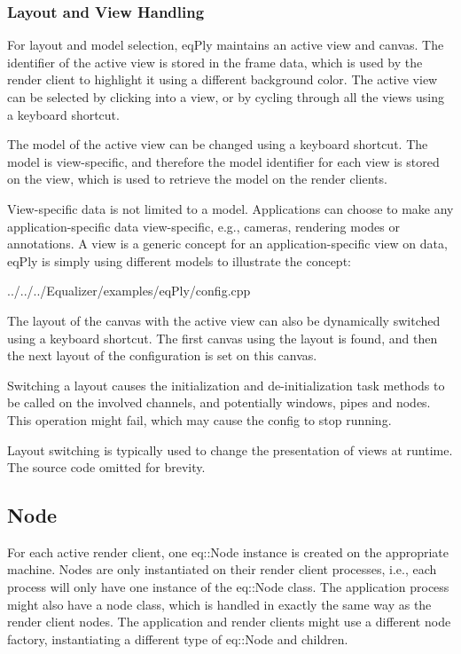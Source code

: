 \documentclass[10pt,a4]{scrartcl}
\begin{document}
\subsubsection{Layout and View Handling}

For layout and model selection, \textsf{eqPly} maintains an active view
and canvas. The identifier of the active view is stored in the frame
data, which is used by the render client to highlight it using a
different background color. The active view can be selected by clicking
into a view, or by cycling through all the views using a keyboard
shortcut.

The model of the active view can be changed using a keyboard
shortcut. The model is view-specific, and therefore the model identifier
for each view is stored on the view, which is used to retrieve the model
on the render clients. 

View-specific data is not limited to a model. Applications can choose to make
any application-specific data view-specific, e.g., cameras, rendering modes or
annotations. A view is a generic concept for an application-specific view on
data, \textsf{eqPly} is simply using different models to illustrate the concept:

{\footnotesize
  {../../../Equalizer/examples/eqPly/config.cpp}}

The layout of the canvas with the active view can also be dynamically
switched using a keyboard shortcut. The first canvas using the layout is
found, and then the next layout of the configuration is set on this
canvas. 

Switching a layout causes the initialization and de-initialization task
methods to be called on the involved channels, and potentially windows,
pipes and nodes. This operation might fail, which may cause the config
to stop running.

Layout switching is typically used to change the presentation of views
at runtime. The source code omitted for brevity.


\subsection{Node}

For each active render client, one \textsf{eq::Node} instance is created on the
appropriate machine. Nodes are only instantiated on their render client
processes, i.e., each process will only have one instance of the
\textsf{eq::Node} class. The application process might also have a node class,
which is handled in exactly the same way as the render client nodes. The
application and render clients might use a different node factory, instantiating
a different type of \textsf{eq::Node} and children.
\end{document}
